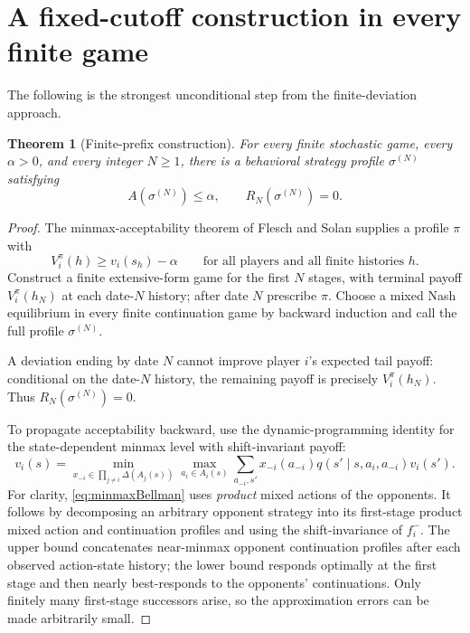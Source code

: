 \documentclass[11pt,a4paper]{article}
\numberwithin{equation}{section}
\newtheorem{theorem}{Theorem}[section]
\theoremstyle{definition}
\theoremstyle{remark}
\newcommand{\sig}{\sigma}
\begin{document}
\section{A fixed-cutoff construction in every finite game}
\label{sec:prefix}
The following is the strongest unconditional step from the
finite-deviation approach.

\begin{theorem}[Finite-prefix construction]\label{thm:prefix}
For every finite stochastic game, every $\alpha>0$, and every integer
$N\ge1$, there is a behavioral strategy profile $\sig^{(N)}$ satisfying
\begin{equation}\label{eq:prefix}
 A(\sig^{(N)})\le\alpha,
 \qquad R_N(\sig^{(N)})=0.
\end{equation}
\end{theorem}
\begin{proof}
The minmax-acceptability theorem of Flesch and Solan
\cite[Theorem~4.4]{fleschsolan2023} supplies a profile $\pi$ with
\begin{equation}\label{eq:acceptablepi}
 V_i^\pi(h)\ge v_i(s_h)-\alpha
 \qquad\text{for all players and all finite histories }h.
\end{equation}
Construct a finite extensive-form game for the first $N$ stages, with
terminal payoff $V_i^\pi(h_N)$ at each date-$N$ history; after date $N$
prescribe $\pi$. Choose a mixed Nash equilibrium in every finite
continuation game by backward induction and call the full profile
$\sig^{(N)}$.

A deviation ending by date $N$ cannot improve player $i$'s expected
tail payoff: conditional on the date-$N$ history, the remaining payoff
is precisely $V_i^\pi(h_N)$. Thus $R_N(\sig^{(N)})=0$.

To propagate acceptability backward, use the dynamic-programming identity
for the state-dependent minmax level with shift-invariant payoff:
\begin{equation}\label{eq:minmaxBellman}
 v_i(s)=\min_{x_{-i}\in\prod_{j\ne i}\Delta(A_j(s))}
 \max_{a_i\in A_i(s)}
 \sum_{a_{-i},s'}x_{-i}(a_{-i})q(s'\mid s,a_i,a_{-i})v_i(s').
\end{equation}
For clarity, \eqref{eq:minmaxBellman} uses \emph{product} mixed actions
of the opponents. It follows by decomposing an arbitrary opponent
strategy into its first-stage product mixed action and continuation
profiles and using the shift-invariance of $f_i^-$. The upper bound
concatenates near-minmax opponent continuation profiles after each
observed action-state history; the lower bound responds optimally at
the first stage and then nearly best-responds to the opponents'
continuations. Only finitely many first-stage successors arise, so the
approximation errors can be made arbitrarily small.


\end{proof}
\end{document}

